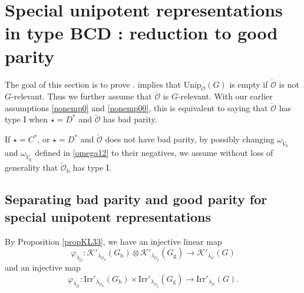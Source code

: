 \documentclass[12pt,a4paper]{amsart}
\newcommand{\CK}{{\mathcal {K}}}
\newcommand{\CO}{{\mathcal {O}}}
\newcommand{\be}{\begin {equation}}
\newcommand{\ee}{\end {equation}}
\numberwithin{equation}{section}
\theoremstyle{remark}
\def\Irr{\mathrm{Irr}}
\def\Unip{\mathrm{Unip}}
\begin{document}
\section{Special unipotent representations in type BCD :  reduction to good parity}

The goal of this section is to prove .
 implies that $\Unip_{\check \CO}(G)$ is empty if  $\check \CO$ is not $G$-relevant. Thus we further assume that $\check \CO$ is $G$-relevant. With our earlier assumptions \eqref{nonemp0} and \eqref{nonemp00}, this is equivalent to saying that $\check \CO$ has type I when $\star=D^*$ and $\check \CO$ has bad parity.


If $\star=C^*$, or $\star=D^*$ and $\check \CO $ does not have bad parity, by possibly changing $\omega_{\check V_\mathrm b}$ and $\omega_{\check V_\mathrm g}$ defined in \eqref{omega12} to their negatives, we
assume without loss of generality that  ${\check \CO_\mathrm b}$ has type I.

\subsection{Separating bad parity and good parity for special unipotent representations}

By Proposition \ref{propKL33},  we have an injective linear map
\[
 \varphi_{\lambda_{\check \CO}} : \CK'_{\lambda_{\check \CO_\mathrm b}}(G_{\mathrm b})\otimes  \CK'_{\lambda_{\check \CO_\mathrm g}}(G_{\mathrm g})\rightarrow\CK'_{\lambda_{\check \CO}}(G)
\]
and an injective map
\be\label{injirr}
   \varphi_{\lambda_{\check \CO}} : \Irr'_{\lambda_{\check \CO_\mathrm b}}(G_\mathrm b)\times  \Irr'_{\lambda_{\check \CO_\mathrm g}}(G_\mathrm g)\rightarrow  \Irr'_{\lambda_{\check \CO}}(G).
\ee
\end{document}
